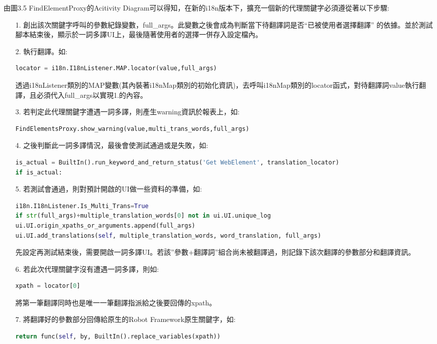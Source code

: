 由圖3.5 FindElementProxy的Acitivity Diagram可以得知，在新的i18n版本下，擴充一個新的代理關鍵字必須遵從著以下步驟:
\begin{itemize}
\item[1.]創出該次關鍵字呼叫的參數紀錄變數，full\_args。此變數之後會成為判斷當下待翻譯詞是否“已被使用者選擇翻譯” 的依據。並於測試腳本結束後，顯示於一詞多譯UI上，最後隨著使用者的選擇一併存入設定檔內。

\item[2.]執行翻譯。如:
\begin{lstlisting}[language={python}]
locator = i18n.I18nListener.MAP.locator(value,full_args)
\end{lstlisting}
透過i18nListener類別的MAP變數(其內裝著i18nMap類別的初始化資訊)，去呼叫i18nMap類別的locator函式，對待翻譯詞value執行翻譯，且必須代入full\_args以實現1.的內容。

\item[3.]若判定此代理關鍵字遭遇一詞多譯，則產生warning資訊於報表上，如:
\begin{lstlisting}[language={python}]
FindElementsProxy.show_warning(value,multi_trans_words,full_args)
\end{lstlisting}

\item[4.]之後判斷此一詞多譯情況，最後會使測試通過或是失敗，如:
\begin{lstlisting}[language={python}]
is_actual = BuiltIn().run_keyword_and_return_status('Get WebElement', translation_locator)
if is_actual:
\end{lstlisting}

\item[5.]若測試會通過，則對預計開啟的UI做一些資料的準備，如:
\begin{lstlisting}[language={python}]
i18n.I18nListener.Is_Multi_Trans=True
if str(full_args)+multiple_translation_words[0] not in ui.UI.unique_log
ui.UI.origin_xpaths_or_arguments.append(full_args)
ui.UI.add_translations(self, multiple_translation_words, word_translation, full_args)
\end{lstlisting}
先設定再測試結束後，需要開啟一詞多譯UI。若該”參數+翻譯詞”組合尚未被翻譯過，則記錄下該次翻譯的參數部分和翻譯資訊。

\item[6.]若此次代理關鍵字沒有遭遇一詞多譯，則如:
\begin{lstlisting}[language={python}]
xpath = locator[0]
\end{lstlisting}
將第一筆翻譯同時也是唯一一筆翻譯指派給之後要回傳的xpath。

\item[7.]將翻譯好的參數部分回傳給原生的Robot Framework原生關鍵字，如:
\begin{lstlisting}[language={python}]
return func(self, by, BuiltIn().replace_variables(xpath))
\end{lstlisting}
\end{itemize}

